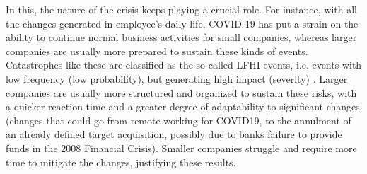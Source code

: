 \documentclass[12pt]{article}
\begin{document}
\begin{table}[H]
\centering
\caption{Average market cap. of the worst performing stocks of the selected crises. Values in USDm.}
\label{avg_mkt_cap}
\end{table}

In this, the nature of the crisis keeps playing a crucial role. For instance, with all the changes generated in employee's daily life, COVID-19 has put a strain on the ability to continue normal business activities for small companies, whereas larger companies are usually more prepared to sustain these kinds of events. Catastrophes like these are classified as the so-called LFHI events, i.e. events with low frequency (low probability), but generating high impact (severity) \cite{sironi2007risk}. Larger companies are usually more structured and organized to sustain these risks, with a quicker reaction time and a greater degree of adaptability to significant changes (changes that could go from remote working for COVID19, to the annulment of an already defined target acquisition, possibly due to banks failure to provide funds in the 2008 Financial Crisis). Smaller companies struggle and require more time to mitigate the changes, justifying these results.
\end{document}
